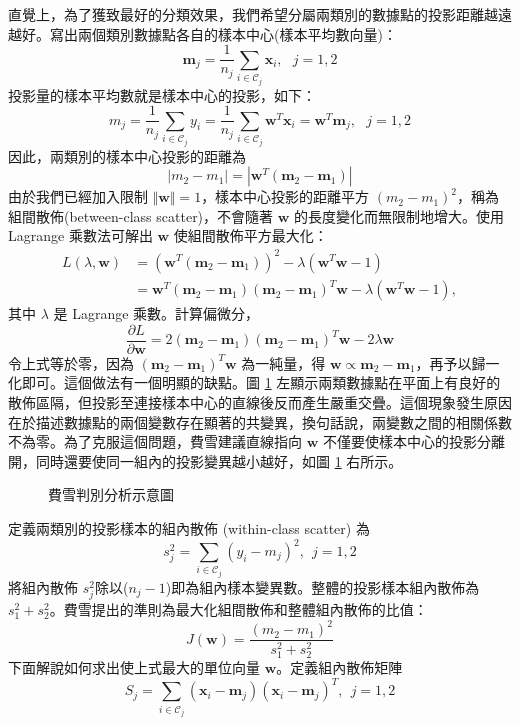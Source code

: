 \documentclass[12pt, a4paper]{article}
\begin{document}
直覺上，為了獲致最好的分類效果，我們希望分屬兩類別的數據點的投影距離越遠越好。寫出兩個類別數據點各自的樣本中心(樣本平均數向量)：
$$\displaystyle  \mathbf{m}_j=\frac{1}{n_j}\sum_{i\in\mathcal{C}_j}\mathbf{x}_i,~~~j=1,2$$
投影量的樣本平均數就是樣本中心的投影，如下：
$$\displaystyle  m_j=\frac{1}{n_j}\sum_{i\in\mathcal{C}_j}y_i=\frac{1}{n_j}\sum_{i\in\mathcal{C}_j}\mathbf{w}^T\mathbf{x}_i=\mathbf{w}^T\mathbf{m}_j,~~~j=1,2$$
因此，兩類別的樣本中心投影的距離為
$$\displaystyle  \vert m_2-m_1\vert=\left|\mathbf{w}^T(\mathbf{m}_2-\mathbf{m}_1)\right|$$
由於我們已經加入限制 $\Vert\mathbf{w}\Vert=1$，樣本中心投影的距離平方 $(m_2-m_1)^2$，稱為組間散佈(between-class scatter)，不會隨著 $\mathbf{w}$ 的長度變化而無限制地增大。使用 Lagrange 乘數法可解出 $\mathbf{w}$ 使組間散佈平方最大化：
$$\displaystyle\begin{aligned}  L(\lambda,\mathbf{w})&=\left(\mathbf{w}^T(\mathbf{m}_2-\mathbf{m}_1)\right)^2-\lambda(\mathbf{w}^T\mathbf{w}-1)\\  &=\mathbf{w}^T(\mathbf{m}_2-\mathbf{m}_1)(\mathbf{m}_2-\mathbf{m}_1)^T\mathbf{w}-\lambda(\mathbf{w}^T\mathbf{w}-1),  \end{aligned}$$
其中 $\lambda$ 是 Lagrange 乘數。計算偏微分，
$$\displaystyle  \frac{\partial L}{\partial\mathbf{w}}=2(\mathbf{m}_2-\mathbf{m}_1)(\mathbf{m}_2-\mathbf{m}_1)^T\mathbf{w}-2\lambda\mathbf{w}$$
令上式等於零，因為 $(\mathbf{m}_2-\mathbf{m}_1)^T\mathbf{w}$ 為一純量，得 $\mathbf{w}\propto\mathbf{m}_2-\mathbf{m}_1$，再予以歸一化即可。這個做法有一個明顯的缺點。圖 \ref{fig:fisher-discriminant} 左顯示兩類數據點在平面上有良好的散佈區隔，但投影至連接樣本中心的直線後反而產生嚴重交疊。這個現象發生原因在於描述數據點的兩個變數存在顯著的共變異，換句話說，兩變數之間的相關係數不為零。為了克服這個問題，費雪建議直線指向 $\mathbf{w}$ 不僅要使樣本中心的投影分離開，同時還要使同一組內的投影變異越小越好，如圖 \ref{fig:fisher-discriminant} 右所示。
\begin{figure}[H]
    \caption{費雪判別分析示意圖}
    \label{fig:fisher-discriminant}
\end{figure}
定義兩類別的投影樣本的組內散佈 (within-class scatter) 為
$$\displaystyle  s_j^2=\sum_{i\in\mathcal{C}_j}(y_i-m_j)^2,~~j=1,2$$
將組內散佈 $s_j^2$除以($n_j-1$)即為組內樣本變異數。整體的投影樣本組內散佈為$s_1^2+s_2^2$。費雪提出的準則為最大化組間散佈和整體組內散佈的比值：
$$\displaystyle  J(\mathbf{w})=\frac{(m_2-m_1)^2}{s_1^2+s_2^2}$$
下面解說如何求出使上式最大的單位向量 $\mathbf{w}$。定義組內散佈矩陣
$$\displaystyle  S_j=\sum_{i\in\mathcal{C}_j}(\mathbf{x}_i-\mathbf{m}_j)(\mathbf{x}_i-\mathbf{m}_j)^T,~~j=1,2$$
\end{document}

